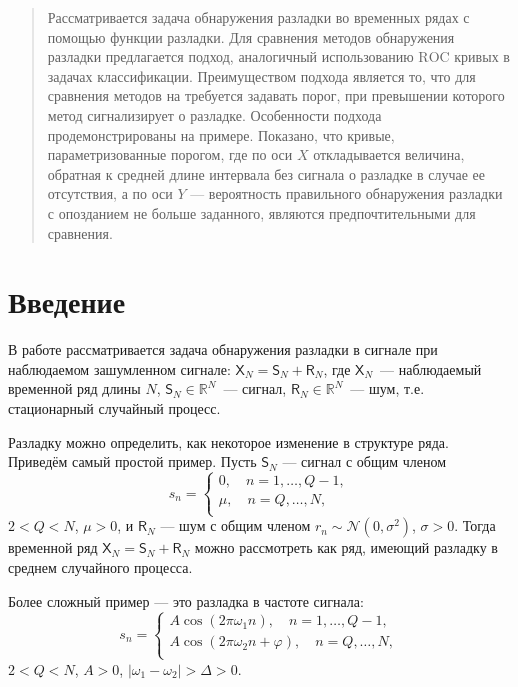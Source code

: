 \documentclass{math-mech-sci}
\newcommand{\X}{\mathsf X}
\renewcommand{\S}{\mathsf S}
\newcommand{\R}{\mathsf R}
\begin{document}
\maketitle

\begin{abstract}
		Рассматривается задача обнаружения разладки во временных рядах с помощью функции разладки. Для сравнения методов обнаружения разладки предлагается подход, аналогичный использованию $\mathrm{ROC}$ кривых в
задачах классификации. Преимуществом подхода является то, что для сравнения методов на требуется задавать порог, при превышении которого метод сигнализирует о разладке. Особенности подхода продемонстрированы на примере. Показано, что кривые, параметризованные порогом, где по оси $X$ откладывается величина, обратная к средней длине интервала без сигнала о разладке в случае ее отсутствия, а по оси $Y$ --- вероятность правильного обнаружения разладки с опозданием не больше заданного, являются предпочтительными для сравнения.
\end{abstract}

\section{Введение}

В работе рассматривается задача обнаружения разладки в сигнале при наблюдаемом зашумленном сигнале:  $\X_N=\S_N+\R_N$, где $\X_N$~--- наблюдаемый временной ряд длины $N$, $\S_N\in\mathbb R^N$~--- сигнал, $\R_N\in\mathbb R^N$~--- шум, т.е. стационарный случайный процесс.

Разладку можно определить, как некоторое изменение в структуре ряда. Приведём самый простой пример. Пусть $\S_N$ --- сигнал с общим членом
\begin{equation}\label{eq:mu}
s_n=\begin{cases}
 0,\quad n=1,\ldots,Q-1,\\
 \mu,\quad n=Q,\ldots,N,\\
\end{cases}
\end{equation}
$2<Q<N$, $\mu>0$, и $\R_N$ --- шум с общим членом $r_n\sim\mathcal N(0,\sigma^2)$, $\sigma>0$. Тогда временной ряд $\X_N=\S_N+\R_N$ можно рассмотреть как ряд, имеющий разладку в среднем случайного процесса.

Более сложный пример --- это разладка в частоте сигнала:
\begin{equation}\label{eq:omega}
s_n=\begin{cases}
 A\cos(2\pi\omega_1n),\quad n=1,\ldots,Q-1,\\
 A\cos(2\pi\omega_2n+\varphi),\quad n=Q,\ldots,N,\\
\end{cases}
\end{equation}
$2<Q<N$, $A>0$, $|\omega_1-\omega_2|>\Delta>0$.
\end{document}
